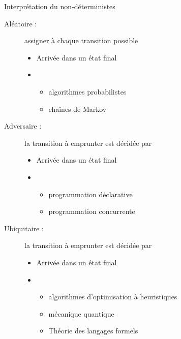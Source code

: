 
\begingroup

\begin{frame}{Interprétation du non-déterministes}
  \begin{description}
  \item[Aléatoire :] assigner  à chaque transition possible
    \begin{itemize}
    \item Arrivée dans un état final 
    \item {} 
      \begin{itemize}
      \item algorithmes probabilistes
      \item chaînes de Markov
      \end{itemize}
    \end{itemize}
  \item[Adversaire :] la transition à emprunter est décidée par 
    \begin{itemize}
    \item Arrivée dans un état final 
    \item {} 
      \begin{itemize}
      \item programmation déclarative
      \item programmation concurrente
      \end{itemize}
    \end{itemize}
  \item[Ubiquitaire :] la transition à emprunter est décidée par 
    \begin{itemize}
    \item Arrivée dans un état final 
    \item {} 
      \begin{itemize}
      \item algorithmes d'optimisation à heuristiques
      \item mécanique quantique
      \item \alert{Théorie des langages formels}
      \end{itemize}
    \end{itemize}
  \end{description}
\end{frame}

\endgroup
